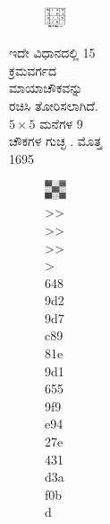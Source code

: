 \begin{figure}[H]
\begin{figure}[H]
\begin{figure}[h]
\begin{figure}[h]
\begin{itemize}
\begin{figure}[H]
	\begin{figure}[H]
	\includegraphics[scale=.9]{src/figures/chap3/fig3.36.jpg}
	\end{figure}

	ಇದೇ ವಿಧಾನದಲ್ಲಿ 15 ಕ್ರಮವರ್ಗದ ಮಾಯಾಚೌಕವನ್ನು ರಚಿಸಿ ತೋರಿಸಲಾಗಿದೆ. $5 \times 5$ ಮನೆಗಳ 9 ಚೌಕಗಳ ಗುಚ್ಛ . ಮೊತ್ತ 1695
	\begin{figure}[!h]
	\includegraphics[scale=.8]{src/figures/chap3/fig3.37.jpg}
>>>>>>> 6489d29d7c8981e9d16559f9e9427e431d3af0bd
	\end{figure}


\end{figure}
\end{itemize}
\end{figure}
\end{figure}
\end{figure}
\end{figure}
